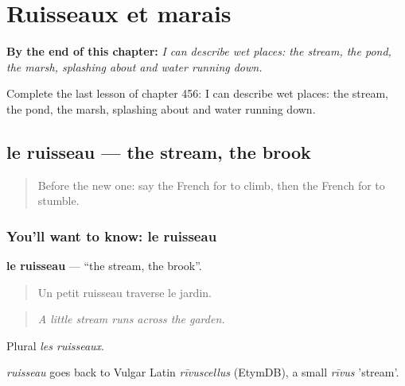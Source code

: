 
\chapter{Ruisseaux et marais}
\label{ch:fr-ruisseaux-et-marais}

\begin{chapteropening}
\textbf{By the end of this chapter:} \emph{I can describe wet places: the stream, the pond, the marsh, splashing about and water running down.}

Complete the last lesson of chapter 456: I can describe wet places: the stream, the pond, the marsh, splashing about and water running down.
\end{chapteropening}

\section[le ruisseau]{le ruisseau — the stream, the brook}

\label{lesson:FR-C456-ruisseau}



\begin{quote}
Before the new one: say the French for to climb, then the French for to stumble.
\end{quote}

\subsection*{You'll want to know: le ruisseau}
\textbf{le ruisseau} — \textquotedblleft{}the stream, the brook\textquotedblright{}.

\begin{quote}
Un petit ruisseau traverse le jardin.
\end{quote}

\begin{quote}
\emph{A little stream runs across the garden.}
\end{quote}

Plural \emph{les ruisseaux}.

\begin{cousinweb}
\emph{ruisseau} goes back to Vulgar Latin \emph{rīvuscellus} (EtymDB), a small \emph{rīvus} 'stream'.
\end{cousinweb}

